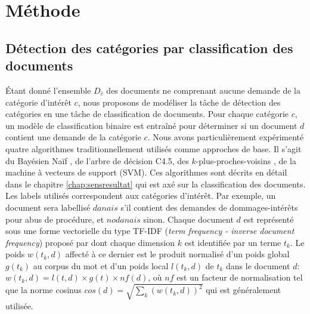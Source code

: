 \section{Méthode}

\subsection{Détection des catégories par classification des documents}

Étant donné l'ensemble $D_{\overline{c}}$ des documents ne comprenant aucune demande de la catégorie d'intérêt $c$, nous proposons de modéliser la tâche de détection des catégories en une tâche de classification de documents. Pour chaque catégorie $c$, un modèle de classification binaire est entraîné pour déterminer si un document $d$ contient une demande de la catégorie $c$. Nous avons particulièrement expérimenté quatre algorithmes traditionnellement utilisés comme approches de base. Il s'agit du Bayésien Naïf , de l'arbre de décision C4.5, des $k$-plus-proches-voisins \citep{cover1967knn}, de la machine à vecteurs de support (SVM). Ces algorithmes sont décrits en détail dans le chapitre \ref{chap:sensresultat} qui est axé sur la classification des documents. Les labels utilisés correspondent aux catégories d'intérêt. Par exemple, un document sera labellisé $danais$ s'il contient des demandes de dommages-intérêts pour abus de procédure, et $nodanais$ sinon. Chaque document $d$ est représenté sous une forme vectorielle du type TF-IDF (\textit{term frequency - inverse document frequency}) proposé par \cite{salton1988term-weighting} dont chaque dimension $k$ est identifiée par un terme $t_k$. Le poids $w(t_k, d)$ affecté à ce dernier est le produit normalisé d'un poids global $g(t_k)$ au corpus du mot et d'un poids local $l(t_k,d)$ de $t_k$ dans le document $d$: $w(t_k, d) = l(t,d) \times g(t) \times nf(d)$, où $nf$ est un facteur de normalisation tel que la norme cosinus $cos(d) = \sqrt{\sum\limits_k (w(t_k,d))^2}$ qui est généralement utilisée. 

